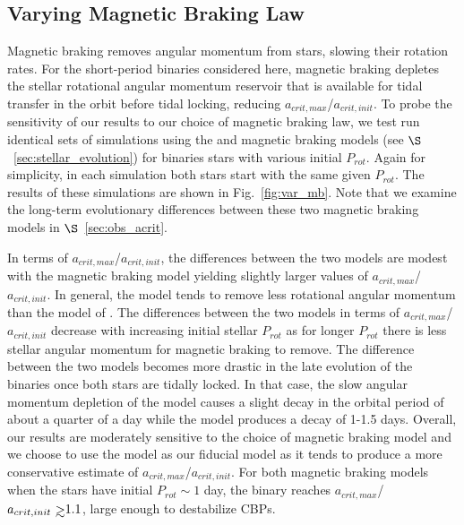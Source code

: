 \subsection{Varying Magnetic Braking Law} \label{sec:var_mb}

Magnetic braking removes angular momentum from stars, slowing their rotation rates.  For the short-period binaries considered here, magnetic braking depletes the stellar rotational angular momentum reservoir that is available for tidal transfer in the orbit before tidal locking, reducing $a_{crit,max}$/$a_{crit,init}$.  To probe the sensitivity of our results to our choice of magnetic braking law, we test run identical sets of simulations using the \citet{Reiners2012} and \citet{Repetto2014} magnetic braking models (see $\S$~\ref{sec:stellar_evolution}) for binaries stars with various initial $P_{rot}$.  Again for simplicity, in each simulation both stars start with the same given $P_{rot}$.  The results of these simulations are shown in Fig.~\ref{fig:var_mb}.  Note that we examine the long-term evolutionary differences between these two magnetic braking models in $\S$~\ref{sec:obs_acrit}.

In terms of $a_{crit,max}$/$a_{crit,init}$, the differences between the two models are modest with the \citet{Repetto2014} magnetic braking model yielding slightly larger values of $a_{crit,max}$/$a_{crit,init}$.  In general, the \citet{Repetto2014} model tends to remove less rotational angular momentum than the model of \citet{Reiners2012}.  The differences between the two models in terms of $a_{crit,max}$/$a_{crit,init}$ decrease with increasing initial stellar $P_{rot}$ as for longer $P_{rot}$ there is less stellar angular momentum for magnetic braking to remove.  The difference between the two models becomes more drastic in the late evolution of the binaries once both stars are tidally locked.  In that case, the slow angular momentum depletion of the \citet{Repetto2014} model causes a slight decay in the orbital period of about a quarter of a day while the \citet{Reiners2012} model produces a decay of 1-1.5 days.  Overall, our results are moderately sensitive to the choice of magnetic braking model and we choose to use the \citet{Reiners2012} model as our fiducial model as it tends to produce a more conservative estimate of $a_{crit,max}$/$a_{crit,init}$.  For both magnetic braking models when the stars have initial $P_{rot} \sim 1$ day, the binary reaches $a_{crit,max}$/$a_{crit,init} \gsim 1.1$, large enough to destabilize CBPs.  

